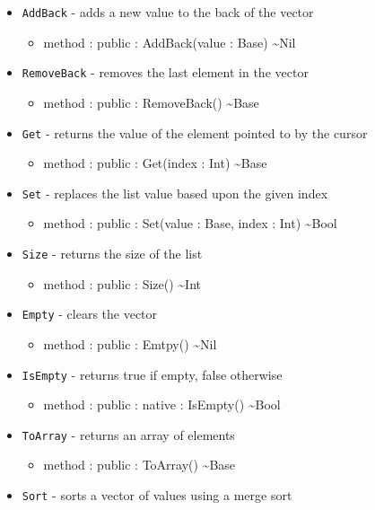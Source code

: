 \documentclass[11pt]{article}
\begin{document}
\begin{itemize}
\item \texttt{AddBack} - adds a new value to the back of the vector
  \begin{itemize}
  \item method : public : AddBack(value : Base) \textasciitilde Nil
  \end{itemize}
\item \texttt{RemoveBack} - removes the last element in the vector
  \begin{itemize}
  \item method : public : RemoveBack() \textasciitilde Base
  \end{itemize}
\item \texttt{Get} - returns the value of the element pointed to by
  the cursor
  \begin{itemize}
  \item method : public : Get(index : Int) \textasciitilde Base
  \end{itemize}
\item \texttt{Set} - replaces the list value based upon the given
  index
  \begin{itemize}
  \item method : public : Set(value : Base, index : Int)
    \textasciitilde Bool
  \end{itemize}
\item \texttt{Size} - returns the size of the list
  \begin{itemize}
  \item method : public : Size() \textasciitilde Int
  \end{itemize}
\item \texttt{Empty} - clears the vector
  \begin{itemize}
  \item method : public : Emtpy() \textasciitilde Nil
  \end{itemize}
\item \texttt{IsEmpty} - returns true if empty, false otherwise
  \begin{itemize}
  \item method : public : native : IsEmpty() \textasciitilde Bool
  \end{itemize}
\item \texttt{ToArray} - returns an array of elements
  \begin{itemize}
  \item method : public : ToArray() \textasciitilde Base
  \end{itemize}
\item \texttt{Sort} - sorts a vector of values using a merge sort

\end{itemize}
\end{document}
